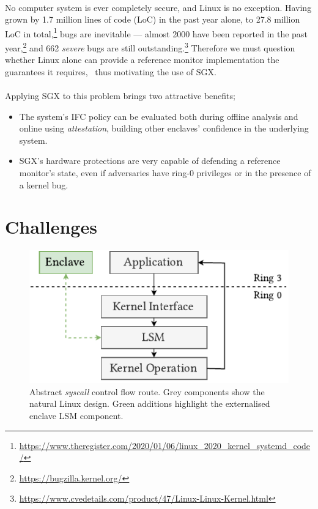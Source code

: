 \paragraph{} No computer system is ever completely secure, and Linux is no exception. Having grown by 1.7 million lines of code (LoC) in the past year alone, to 27.8 million LoC in total,\footnote{\url{https://www.theregister.com/2020/01/06/linux\_2020\_kernel\_systemd\_code/}} bugs are inevitable --- almost 2000 have been reported in the past year,\footnote{\url{https://bugzilla.kernel.org/}} and 662 \textit{severe} bugs are still outstanding.\footnote{\url{https://www.cvedetails.com/product/47/Linux-Linux-Kernel.html}} Therefore we must question whether Linux alone can provide a reference monitor implementation the guarantees it requires,~\cite{Lipp2018MeltdownRK, 10.5555/2831143.2831164} thus motivating the use of SGX.

\paragraph{} Applying SGX to this problem brings two attractive benefits;
\begin{itemize}
    \item The system's IFC policy can be evaluated both during offline analysis and online using \textit{attestation}, building other enclaves' confidence in the underlying system.
    \item SGX's hardware protections are very capable of defending a reference monitor's state, even if adversaries have ring-0 privileges or in the presence of a kernel bug.
\end{itemize}

\section{Challenges}
\label{sec:challenges}

\begin{figure}[]
    \centering
    \includegraphics[width=0.48\linewidth]{figures/SGX-EnclaveIntegration.pdf}
    \caption{Abstract \textit{syscall} control flow route. Grey components show the natural Linux design. Green additions highlight the externalised enclave LSM component.}
    \vspace{5mm}
    \label{fig:sgx-abstract-integration}
\end{figure}


